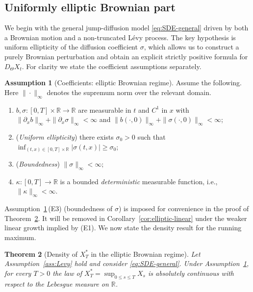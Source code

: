 \documentclass[11pt]{article}
\newcommand{\R}{\mathbb{R}}
\newcommand{\1}{\mathbf{1}}
\newcommand{\Xstar}{X^{\ast}}
\theoremstyle{plain}
\newtheorem{theorem}{Theorem}[section]
\theoremstyle{definition}
\newtheorem{assumption}[theorem]{Assumption}
\theoremstyle{remark}
\begin{document}
\subsection{Uniformly elliptic Brownian part}

We begin with the general jump-diffusion model \eqref{eq:SDE-general} driven by both a Brownian motion and a non-truncated L\'evy process.
The key hypothesis is uniform ellipticity of the diffusion coefficient $\sigma$, which allows us to construct a purely Brownian perturbation
and obtain an explicit strictly positive formula for $D_\Theta X_t$.
For clarity we state the coefficient assumptions separately.


\begin{assumption}[Coefficients: elliptic Brownian regime]\label{ass:elliptic}
Assume the following. Here $\|\cdot\|_\infty$ denotes the supremum norm over the relevant domain.
\begin{enumerate}[label=(E\arabic*),leftmargin=2.7em]
\item $b,\sigma:[0,T]\times\R\to\R$ are measurable in $t$ and $C^1$ in $x$ with
$\|\partial_x b\|_\infty+\|\partial_x\sigma\|_\infty<\infty$ and $\|b(\cdot,0)\|_\infty+\|\sigma(\cdot,0)\|_\infty<\infty$;
\item (\emph{Uniform ellipticity}) there exists $\sigma_0>0$ such that $\inf_{(t,x)\in[0,T]\times\R}|\sigma(t,x)|\ge\sigma_0$;
\item (\emph{Boundedness}) $\|\sigma\|_\infty<\infty$;
\item $\kappa:[0,T]\to\R$ is a bounded \emph{deterministic} measurable function, i.e., $\|\kappa\|_\infty<\infty$.
\end{enumerate}
\end{assumption}

Assumption~\ref{ass:elliptic}\,\textup{(E3)} (boundedness of $\sigma$) is imposed for convenience in the proof of Theorem~\ref{thm:elliptic}.
It will be removed in Corollary~\ref{cor:elliptic-linear} under the weaker linear growth implied by \textup{(E1)}.
We now state the density result for the running maximum.

\begin{theorem}[Density of $\Xstar_T$ in the elliptic Brownian regime]\label{thm:elliptic}
Let Assumption~\ref{ass:Levy} hold and consider \eqref{eq:SDE-general}.
Under Assumption~\ref{ass:elliptic}, for every $T>0$ the law of $\Xstar_T=\sup_{0\le s\le T}X_s$
is absolutely continuous with respect to the Lebesgue measure on $\R$.
\end{theorem}
\end{document}

